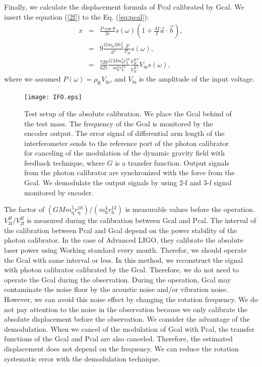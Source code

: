 \documentclass[%
 reprint,
superscriptaddress,
 amsmath,amssymb,
 aps,
]{revtex4-1}
\begin{document}
Finally, we calculate the displacement formula of Pcal calibrated by Gcal. We insert the equation (\ref{2f}) to the Eq. (\ref{eq:pcal}):
\begin{eqnarray}
x&=&\frac{P \cos{\theta}}{2c} s(\omega)\left(1+\frac{M}{I}\vec{a} \cdot \vec{b} \right), \\
 &=&9\frac{Gm_{\mathrm{q}} M r_{\mathrm{q}}^2}{d^4}\frac{P}{P_{\mathrm{2f}}}s(\omega) , \\
 &=&\frac{729}{625} \frac{GM m^5_{\mathrm{q}} r_{\mathrm{q}}^{10}}{m^4_{\mathrm{h}} r_{\mathrm{h}}^{12} } \frac{{V_{\mathrm{3f}}^{R}}^4}{{V_{\mathrm{2f}}^{R}}^5}V_{\mathrm{in}} s(\omega)  , \label{pcal_new}
\end{eqnarray}
where we assumed $P(\omega)=\rho_{\mathrm{R}} V_{\mathrm{in}}$, and $V_{\mathrm{in}}$ is the amplitude of the input voltage.
\begin{figure}
\begin{center}
\texttt{[image: IFO.eps]}
\caption{Test setup of the absolute calibration. We place the Gcal behind of the test mass. The frequency of the Gcal is monitored by the encoder output. The error signal of differential arm length of the interferometer sends to the reference port of the photon calibrator for canceling of the modulation of the dynamic gravity field with feedback technique, where $G$ is a transfer function. Output signals from the photon calibrator are synchronized with the force from the Gcal. We demodulate the output signals by using 2-f and 3-f signal monitored by encoder.}
\label{fig:IFO}
\end{center}
\end{figure}
The factor of $(GMm_{\mathrm{q}}^5 r_{\mathrm{q}}^{10})/(m_{\mathrm{h}}^4 r_{\mathrm{h}}^{12})$ is measurable values before the operation.  $V^R_{\mathrm{3f}}/V^R_{\mathrm{2f}}$ is measured during the calibration between Gcal and Pcal. The interval of the calibration between Pcal and Gcal depend on the power stability of the photon calibrator. In the case of Advanced LIGO, they calibrate the absolute laser power using Working standard every month. Therefor, we should operate the Gcal with same interval or less. In this method, we reconstruct the signal with photon calibrator calibrated by the Gcal.  Therefore, we do not need to operate the Gcal during the observation.
During the operation, Gcal may contaminate the noise floor by the acoustic noise and/or vibration noise. However, we can avoid this noise effect by changing the rotation frequency. We do not pay attention to the noise in the observation because we only calibrate the absolute displacement before the observation.
We consider the advantage of the demodulation. When we cancel of the modulation of Gcal with Pcal, the transfer functions of the Gcal and Pcal are also canceled. Therefore, the estimated displacement does not depend on the frequency. We can reduce the rotation systematic error with the demodulation technique.
\end{document}
